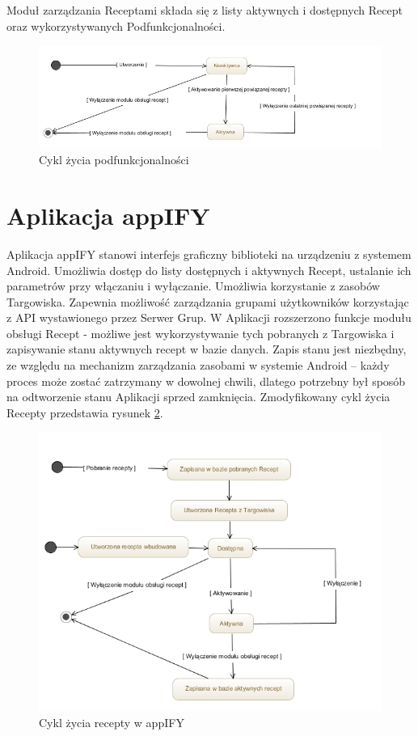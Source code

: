 \documentclass[11pt,a4paper,polish,thesis]{dcsbook}
\begin{document}
Moduł zarządzania Receptami składa się z listy aktywnych i dostępnych Recept oraz wykorzystywanych Podfunkcjonalności.
\begin{figure}[H]
  \centering
  \includegraphics[scale=0.6]{./resources/cykl-zycia-featurea.jpg}
  \caption{Cykl życia podfunkcjonalności}
  \label{fig:cykl-zycia-featurea}
\end{figure}

\section{Aplikacja appIFY}
Aplikacja appIFY stanowi interfejs graficzny biblioteki na urządzeniu z systemem Android. Umożliwia dostęp do listy dostępnych i aktywnych Recept, ustalanie ich parametrów przy włączaniu i wyłączanie. Umożliwia korzystanie z zasobów Targowiska. Zapewnia możliwość zarządzania grupami użytkowników korzystając z API wystawionego przez Serwer Grup.
W Aplikacji rozszerzono funkcje modułu obsługi Recept - możliwe jest wykorzystywanie tych pobranych z Targowiska i zapisywanie stanu aktywnych recept w bazie danych. Zapis stanu jest niezbędny, ze względu na mechanizm zarządzania zasobami w systemie Android -- każdy proces może zostać zatrzymany w dowolnej chwili, dlatego potrzebny był sposób na odtworzenie stanu Aplikacji sprzed zamknięcia. Zmodyfikowany cykl życia Recepty przedstawia rysunek \ref{fig:cykl-zycia-recepty-appify}.
\begin{figure}[H]
  \centering
  \includegraphics[scale=0.7]{./resources/cykl-zycia-recepty-appify.jpg}
  \caption{Cykl życia recepty w appIFY}
  \label{fig:cykl-zycia-recepty-appify}
\end{figure}
\end{document}

